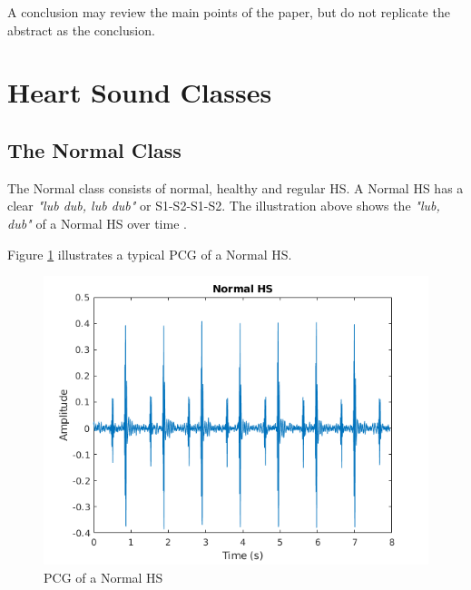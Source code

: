 \documentclass[10pt,twocolumn]{witseiepaper}
\begin{document}
A conclusion may review the main points of the paper, but do not replicate the
abstract as the conclusion.




%








\appendix
\section{Heart Sound Classes}
\label{HS}

\subsection*{The Normal Class}
The Normal class consists of normal, healthy and regular HS. A Normal HS has a clear \textit{"lub dub, lub dub"} or S1-S2-S1-S2. The illustration above shows the \textit{"lub, dub"} of a Normal HS over time \cite{bentley}.


Figure \ref{fig:normal} illustrates a typical PCG of a Normal HS.
\begin{figure}[h!]
    \centering
    \includegraphics[scale = 0.45]{./normal.png}
    \caption{PCG of a Normal HS}
    \label{fig:normal}
\end{figure}{}
\end{document}

